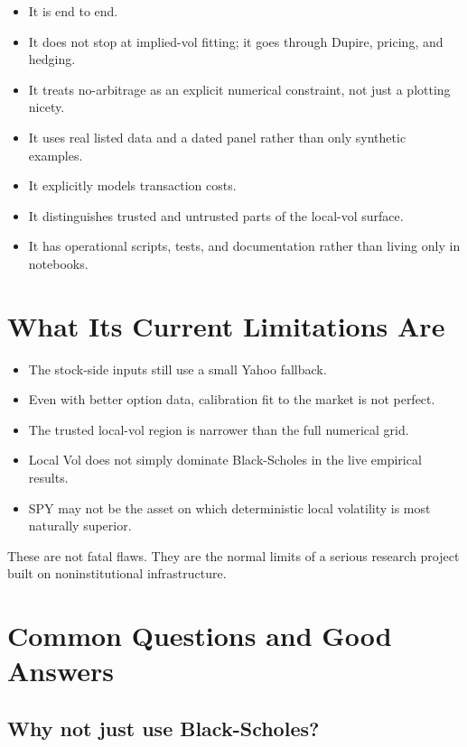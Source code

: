\documentclass[11pt]{article}
\begin{document}
\begin{itemize}
  \item It is end to end.
  \item It does not stop at implied-vol fitting; it goes through Dupire, pricing, and hedging.
  \item It treats no-arbitrage as an explicit numerical constraint, not just a plotting nicety.
  \item It uses real listed data and a dated panel rather than only synthetic examples.
  \item It explicitly models transaction costs.
  \item It distinguishes trusted and untrusted parts of the local-vol surface.
  \item It has operational scripts, tests, and documentation rather than living only in notebooks.
\end{itemize}

\section{What Its Current Limitations Are}

\begin{itemize}
  \item The stock-side inputs still use a small Yahoo fallback.
  \item Even with better option data, calibration fit to the market is not perfect.
  \item The trusted local-vol region is narrower than the full numerical grid.
  \item Local Vol does not simply dominate Black-Scholes in the live empirical results.
  \item SPY may not be the asset on which deterministic local volatility is most naturally superior.
\end{itemize}

These are not fatal flaws. They are the normal limits of a serious research project built on noninstitutional infrastructure.

\section{Common Questions and Good Answers}

\subsection*{Why not just use Black-Scholes?}
\end{document}
